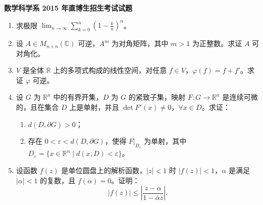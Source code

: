 \documentclass[UTF8,11pt,fontset=none]{ctexart}
\newcommand{\paperheading}[1]{\begin{center}\Large\bfseries #1\end{center}\vspace{.45em}}
\newcommand{\newpaper}[1]{\clearpage\paperheading{#1}}
\begin{document}
\newpaper{数学科学系 2015 年直博生招生考试试题}
\begin{enumerate}
\item 求极限 $\displaystyle\lim_{n\to\infty}\sum_{k=0}^{n}\left(1-\frac{k}{n}\right)^n$。
\item 设 $A\in M_{n\times n}(\mathbb C)$ 可逆，$A^m$ 为对角矩阵，其中 $m>1$ 为正整数。求证 $A$ 可对角化。
\item $V$ 是全体 $\mathbb R$ 上的多项式构成的线性空间，对任意 $f\in V$，$\varphi(f)=f+f'$。求证 $\varphi$ 可逆。
\item 设 $G$ 为 $\mathbb R^n$ 中的有界开集，$D$ 为 $G$ 的紧致子集，映射 $F:G\to\mathbb R^n$ 是连续可微的，且在集合 $D$ 上是单射，并且 $\det F'(x)\ne0$，$\forall x\in D$。求证：
\begin{enumerate}
\item $d(D,\partial G)>0$；
\item 存在 $0<\varepsilon<d(D,\partial G)$，使得 $F|_{D_\varepsilon}$ 为单射，其中
$D_\varepsilon=\{x\in\mathbb R^n\mid d(x,D)<\varepsilon\}$。
\end{enumerate}
\item 设函数 $f(z)$ 是单位圆盘上的解析函数，$|z|<1$ 时 $|f(z)|<1$，$\alpha$ 是满足 $|\alpha|<1$ 的复数，且 $f(\alpha)=0$。证明：
\[
|f(z)|\le\left|\frac{z-\alpha}{1-\overline\alpha z}\right|.
\]
\end{enumerate}
\end{document}
